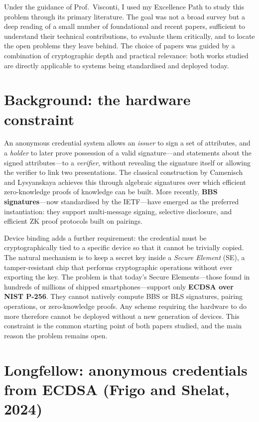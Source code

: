 \documentclass[11pt]{article}
\begin{document}
Under the guidance of Prof.\ Visconti, I used my Excellence Path to study
this problem through its primary literature. The goal was not a broad survey
but a deep reading of a small number of foundational and recent papers,
sufficient to understand their technical contributions, to evaluate them
critically, and to locate the open problems they leave behind. The choice of
papers was guided by a combination of cryptographic depth and practical
relevance: both works studied are directly applicable to systems being
standardised and deployed today.

\section{Background: the hardware constraint}

An anonymous credential system allows an \emph{issuer} to sign a set of
attributes, and a \emph{holder} to later prove possession of a valid
signature---and statements about the signed attributes---to a
\emph{verifier}, without revealing the signature itself or allowing the
verifier to link two presentations. The classical construction by Camenisch
and Lysyanskaya achieves this through algebraic signatures over which
efficient zero-knowledge proofs of knowledge can be built. More recently,
\textbf{BBS signatures}---now standardised by the IETF---have emerged as
the preferred instantiation: they support multi-message signing, selective
disclosure, and efficient ZK proof protocols built on pairings.

Device binding adds a further requirement: the credential must be
cryptographically tied to a specific device so that it cannot be trivially
copied. The natural mechanism is to keep a secret key inside a
\emph{Secure Element} (SE), a tamper-resistant chip that performs
cryptographic operations without ever exporting the key. The problem is that
today's Secure Elements---those found in hundreds of millions of shipped
smartphones---support only \textbf{ECDSA over NIST P-256}. They cannot
natively compute BBS or BLS signatures, pairing operations, or
zero-knowledge proofs. Any scheme requiring the hardware to do more therefore
cannot be deployed without a new generation of devices. This constraint is
the common starting point of both papers studied, and the main reason the
problem remains open.

\section{Longfellow: anonymous credentials from ECDSA (Frigo and Shelat, 2024)}
\end{document}

